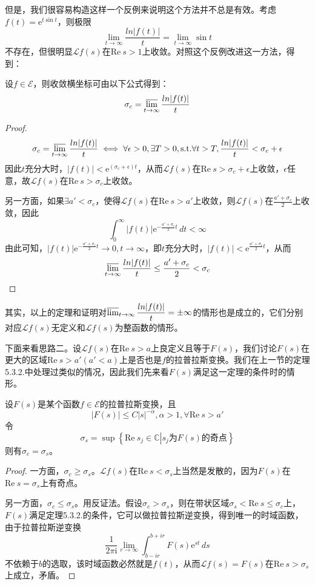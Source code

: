 \documentclass{ctexbook}
\begin{document}
但是，我们很容易构造这样一个反例来说明这个方法并不总是有效。考虑$f(t)=\mathrm{e}^{t\sin t}$，则极限
$$\lim_{t\to\infty}\frac{ln|f(t)|}{t}=\lim_{t\to\infty}\sin t$$
不存在，但很明显$\mathcal{L} f(s)$在$\text{Re}\ s>1$上收敛。对照这个反例改进这一方法，得到：
\begin{theorem}
    设$f\in\mathcal{E} $，则收敛横坐标可由以下公式得到：
    \[\sigma_c=\varlimsup_{t\to\infty}\frac{ln|f(t)|}{t}\]
\end{theorem}
\begin{proof}
    \[\sigma_c=\varlimsup_{t\to\infty}\frac{ln|f(t)|}{t}\iff \forall \epsilon>0,\exists T>0,\text{s.t.}\forall t>T,\frac{ln|f(t)|}{t}<\sigma_c+\epsilon\]
    因此$t$充分大时，$|f(t)|<\mathrm{e}^{(\sigma_c+\epsilon)t}$，从而$\mathcal{L} f(s)$在$\text{Re}\ s>\sigma_c+\epsilon$上收敛，$\epsilon$任意，故$\mathcal{L} f(s)$在$\text{Re}\ s>\sigma_c$上收敛。

    另一方面，如果$\exists a' <\sigma_c$，使得$\mathcal{L} f(s)$在$\text{Re}\ s>a'$上收敛，则$\mathcal{L} f(s)$在$\frac{a'+\sigma_c}{2}$上收敛，因此
    \[\int_{0}^{\infty}|f(t)|\mathrm{e}^{-\frac{a'+\sigma_c}{2}t}\,dt<\infty\]
    由此可知，$|f(t)|\mathrm{e}^{-\frac{a'+\sigma_c}{2}t}\to 0,t\to\infty$，即$t$充分大时，$|f(t)|<\mathrm{e}^{\frac{a'+\sigma_c}{2}t}$，从而
    \[\varlimsup_{t\to\infty}\frac{ln|f(t)|}{t}\leq \frac{a'+\sigma_c}{2}<\sigma_c\]
\end{proof}

其实，以上的定理和证明对$\varlimsup_{t\to\infty}\dfrac{ln|f(t)|}{t}=\pm\infty$的情形也是成立的，它们分别对应$\mathcal{L} f(s)$无定义和$\mathcal{L} f(s)$为整函数的情形。

下面来看思路二。设$\mathcal{L} f(s)$在$\text{Re}\ s>a$上良定义且等于$F(s)$，我们讨论$F(s)$在更大的区域$\text{Re}\ s>a'(a'<a)$上是否也是$f$的拉普拉斯变换。我们在上一节的定理5.3.2.中处理过类似的情况，因此我们先来看$F(s)$满足这一定理的条件时的情形。

\begin{theorem}
    设$F(s)$是某个函数$f\in\mathcal{E} $的拉普拉斯变换，且
    $$|F(s)|\leq C|s|^{-\alpha},\alpha>1,\forall \text{Re}\ s>a'$$
    令
    \[\sigma_s=\sup\left\{\text{Re}\ s_j\in\mathbb{C}\left|s_j\text{为}F(s)\text{的奇点}\right.\right\}\]
    则有$\sigma_c=\sigma_s$。
\end{theorem}
\begin{proof}
    一方面，$\sigma_c\geq\sigma_s$。$\mathcal{L} f(s)$在$\text{Re}\ s<\sigma_s$上当然是发散的，因为$F(s)$在$\text{Re}\ s=\sigma_s$上有奇点。

    另一方面，$\sigma_c\leq\sigma_s$。用反证法。假设$\sigma_c>\sigma_s$，则在带状区域$\sigma_s<\text{Re}\ s\leq\sigma_c$上，$F(s)$满足定理5.3.2.的条件，它可以做拉普拉斯逆变换，得到唯一的时域函数，由于拉普拉斯逆变换
    $$\frac{1}{2\pi \mathrm{i}}\lim_{r\to\infty}\int_{b-ir}^{b+ir}F(s)\mathrm{e}^{st}\,ds$$
    不依赖于$b$的选取，该时域函数必然就是$f(t)$，从而$\mathcal{L} f(s)=F(s)$在$\text{Re}\ s>\sigma_s$上成立，矛盾。
\end{proof}
\end{document}
